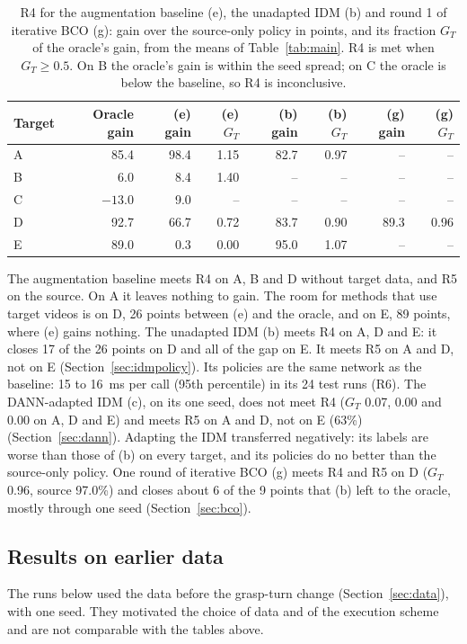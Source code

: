 \documentclass{article}
\begin{document}
\begin{table}[t]
  \caption{R4 for the augmentation baseline (e), the unadapted IDM (b) and round 1 of
  iterative BCO (g): gain over the
  source-only policy in points, and its fraction $G_T$ of the oracle's gain, from the means
  of Table~\ref{tab:main}. R4 is met when $G_T \geq 0.5$. On B the oracle's gain is within
  the seed spread; on C the oracle is below the baseline, so R4 is inconclusive.}
  \label{tab:r4}
  \centering
  \small
  \begin{tabular}{@{}lrrrrrrr@{}}
    \toprule
    Target & Oracle gain & (e) gain & (e) $G_T$ & (b) gain & (b) $G_T$ & (g) gain & (g) $G_T$ \\
    \midrule
    A & 85.4 & 98.4 & 1.15 & 82.7 & 0.97 & -- & -- \\
    B & 6.0 & 8.4 & 1.40 & -- & -- & -- & -- \\
    C & $-13.0$ & 9.0 & -- & -- & -- & -- & -- \\
    D & 92.7 & 66.7 & 0.72 & 83.7 & 0.90 & 89.3 & 0.96 \\
    E & 89.0 & 0.3 & 0.00 & 95.0 & 1.07 & -- & -- \\
    \bottomrule
  \end{tabular}
\end{table}

The augmentation baseline meets R4 on A, B and D without target data, and R5 on the
source. On A it leaves nothing to gain. The room for methods that use target videos is on
D, 26 points between (e) and the oracle, and on E, 89 points, where (e) gains nothing.
The unadapted IDM (b) meets R4 on A, D and E: it closes 17 of the 26 points on D and all
of the gap on E. It meets R5 on A and D, not on E (Section~\ref{sec:idmpolicy}). Its
policies are the same network as the baseline: 15 to 16~ms per call (95th percentile) in
its 24 test runs (R6). The DANN-adapted IDM (c), on its one seed, does not meet R4
($G_T$ 0.07, 0.00 and 0.00 on A, D and E) and meets R5 on A and D, not on E (63\%)
(Section~\ref{sec:dann}). Adapting the IDM transferred negatively: its labels are worse
than those of (b) on every target, and its policies do no better than the source-only
policy. One round of iterative BCO (g) meets R4 and R5 on D ($G_T$ 0.96, source 97.0\%)
and closes about 6 of the 9 points that (b) left to the oracle, mostly through one seed
(Section~\ref{sec:bco}).

\subsection{Results on earlier data}
\label{sec:earlier}
The runs below used the data before the grasp-turn change (Section~\ref{sec:data}), with
one seed. They motivated the choice of data and of the execution scheme and are not
comparable with the tables above.
\end{document}
